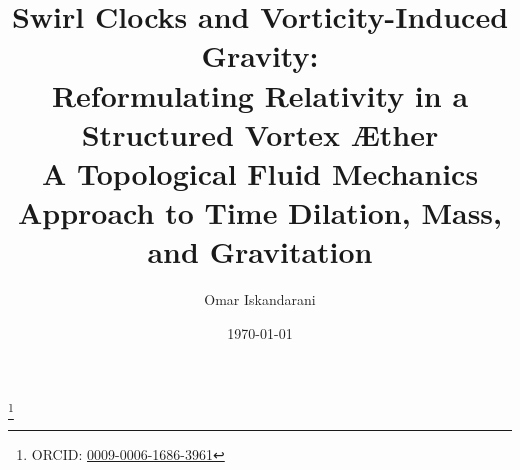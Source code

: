 \documentclass[a4paper, aps,preprint,superscriptaddress, 12pt]{revtex4}
\begin{document}
\author{Omar Iskandarani}
\title{
    Swirl Clocks and Vorticity-Induced Gravity:\\
    Reformulating Relativity in a Structured Vortex Æther\\
    \textnormal{\normalsize A Topological Fluid Mechanics Approach to Time Dilation, Mass, and Gravitation}
}

\date{\today}
\thanks{ORCID: \href{https://orcid.org/0009-0006-1686-3961}{0009-0006-1686-3961}}














\appendix \label{sec:Part-6}
\label{appendix:1}
\label{appendix:2}
\label{appendix:3}
\end{document}
